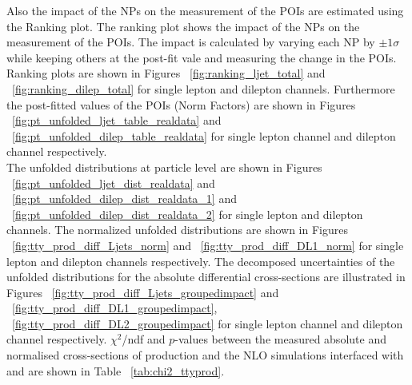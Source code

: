 Also the impact of the NPs on the measurement of the POIs are estimated using the Ranking plot. 
The ranking plot shows the impact of the NPs on the measurement of the POIs. The impact is calculated by varying each NP by $\pm 1 \sigma$ while keeping others at the post-fit vale and measuring the change in the POIs.
Ranking plots are shown in Figures ~\ref{fig:ranking_ljet_total} and ~\ref{fig:ranking_dilep_total} for single lepton and dilepton channels. 
Furthermore the post-fitted values of the POIs (Norm Factors) are shown in Figures ~\ref{fig:pt_unfolded_ljet_table_realdata} and ~\ref{fig:pt_unfolded_dilep_table_realdata} for single lepton channel and dilepton channel respectively.  \\

The unfolded distributions at particle level are shown in Figures ~\ref{fig:pt_unfolded_ljet_dist_realdata} and ~\ref{fig:pt_unfolded_dilep_dist_realdata_1} and ~\ref{fig:pt_unfolded_dilep_dist_realdata_2} for single lepton and dilepton channels. The normalized unfolded distributions are shown in Figures ~\ref{fig:tty_prod_diff_Ljets_norm} and ~\ref{fig:tty_prod_diff_DL1_norm} for single lepton and dilepton channels respectively. The decomposed uncertainties of the unfolded distributions for the absolute differential cross-sections are illustrated in Figures ~\ref{fig:tty_prod_diff_Ljets_groupedimpact} and ~\ref{fig:tty_prod_diff_DL1_groupedimpact}, ~\ref{fig:tty_prod_diff_DL2_groupedimpact} for single lepton channel and dilepton channel respectively. $\chi^2$/ndf and $p$-values between the measured absolute and normalised cross-sections of \tty production and the NLO \MGNLO simulations interfaced with \PYTHIA[8] and \HERWIG[7] are shown in Table ~\ref{tab:chi2_ttyprod}.







